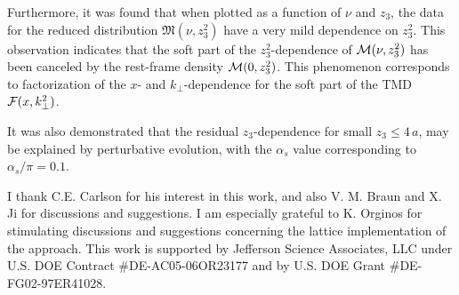 \documentclass[aps,prd,twocolumn,showpacs,preprintnumbers,superscriptaddress,groupedaddress]{revtex4-1}
\begin{document}
 Furthermore, it was  found  that when plotted as a function of $\nu$ and $z_3$,
  the data for the reduced distribution ${\mathfrak  M} (\nu, z_3^2)$  have a very mild dependence 
  on $z_3^2$.   This observation indicates  that 
    the soft part of the \mbox{$z_3^2$-dependence}  of $   {\cal M} (\nu, z_3^2)$ 
    has been  canceled by the rest-frame density $   {\cal M} (0, z_3^2)$.
    This phenomenon corresponds to factorization of the $x$- and $k_\perp$-dependence
    for the  soft part of the TMD ${\cal F} (x, k_\perp^2)$. 
 

     It was also demonstrated that the residual  \mbox{$z_3$-dependence} 
     for small $z_3 \leq 4 \,a$, 
    may be explained by  perturbative evolution, with the $\alpha_s$ value
     corresponding to  $\alpha_s/\pi =0.1$. 
     
     
\acknowledgements


I thank C.E. Carlson for  his 
 interest in  this work, and also V. M.  Braun and X. Ji for discussions
 and suggestions.
  I am especially
grateful to K. Orginos for stimulating discussions and suggestions concerning 
 the lattice implementation of the  approach. 
This work is supported by Jefferson Science Associates,
 LLC under  U.S. DOE Contract \#DE-AC05-06OR23177
 and by U.S. DOE Grant  \mbox{\#DE-FG02-97ER41028. }
 
\end{document}
